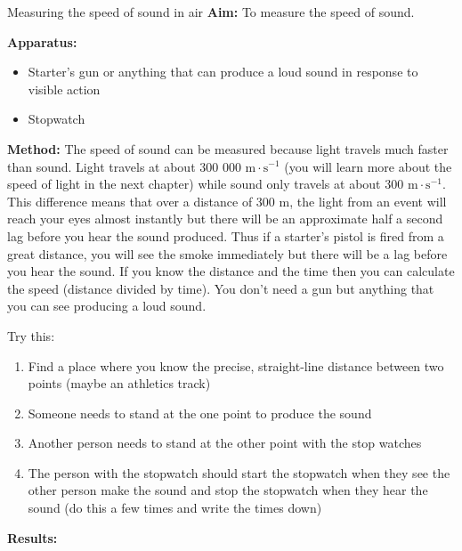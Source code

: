\vspace{-.5cm}
\begin{i_experiment}{\Large{Measuring the speed of sound in air}}
\textbf{Aim:} To measure the speed of sound.

\textbf{Apparatus:} 
\begin{itemize}
 \item Starter's gun or anything that can produce a loud sound in response to visible action
  \item Stopwatch
  \end{itemize}

\textbf{Method:} The speed of sound can be measured because light travels much faster than sound. Light travels at about 300 000 $\text{m}\cdot\text{s}^{-1}$ (you will learn more about the speed of light in the next chapter) while sound only travels at about 300 $\text{m}\cdot\text{s}^{-1}$.  This difference means that over a distance of 300 $\text{m}$, the light from an event will reach your eyes almost instantly but there will be an approximate half a second lag before you hear the sound produced.  Thus if a starter's pistol is fired from a great distance, you will see the smoke immediately but there will be a lag before you hear the sound.  If you know the distance and the time then you can calculate the speed (distance divided by time). You don't need a gun but anything that you can see producing a loud sound.

Try this:
\begin{enumerate}[noitemsep, label=\textbf{\arabic*}. ] 
\item Find a place where you know the precise, straight-line distance between two points (maybe an athletics track)
\item Someone needs to stand at the one point to produce the sound 
\item Another person needs to stand at the other point with the stop watches
\item The person with the stopwatch should start the stopwatch when they see the other person make the sound and stop the stopwatch when they hear the sound (do this a few times and write the times down)
\end{enumerate}
\textbf{Results:}


\end{i_experiment}

